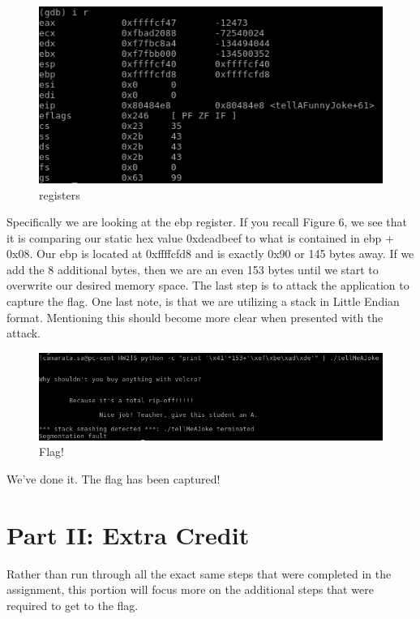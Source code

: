 \documentclass[10pt]{article}
\begin{document}
\begin{figure}[H]
\centering
\includegraphics[scale=0.5]{./images/ss13.png}
\caption{registers}
\label{fig:Code}
\end{figure}

Specifically we are looking at the ebp register.  If you recall Figure 6, we see that it is comparing our static hex value 0xdeadbeef to what is contained in ebp + 0x08.  Our ebp is located at 0xffffcfd8 and is exactly 0x90 or 145 bytes away.  If we add the 8 additional bytes, then we are an even 153 bytes until we start to overwrite our desired memory space.  The last step is to attack the application to capture the flag.  One last note, is that we are utilizing a stack in Little Endian format.  Mentioning this should become more clear when presented with the attack.

\begin{figure}[H]
\centering
\includegraphics[scale=0.5]{./images/ss14.png}
\caption{Flag!}
\label{fig:Code}
\end{figure}

We've done it.  The flag has been captured!

\section{Part II: Extra Credit}

Rather than run through all the exact same steps that were completed in the assignment, this portion will focus more on the additional steps that were required to get to the flag. 
\end{document}
